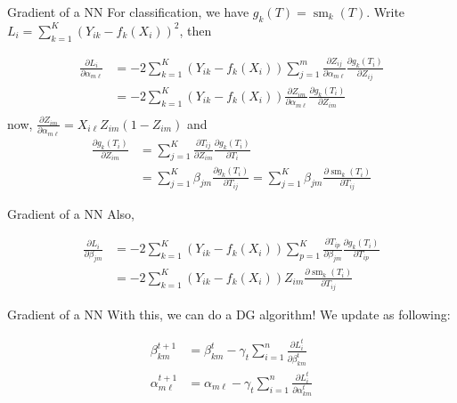 \documentclass[9pt,xcolor=table]{beamer}
\newcommand{\sm}{\operatorname{sm}}
\begin{document}
\begin{frame}{Gradient of a NN}
For classification, we have $g_k(T) = \sm_k(T)$. Write $L_i = \sum_{k=1}^K (Y_{ik} - f_{k}(X_i))^2$, then

\begin{align*}
\frac{\partial L_i}{\partial \alpha_{m \ell}} &= -2\sum_{k=1}^K(Y_{ik}-f_k(X_i))  \sum_{j=1}^m \frac{\partial Z_{ij}}{\partial \alpha_{ m \ell}} \frac{\partial g_k(T_i)}{\partial Z_{ij}}\\
&= -2\sum_{k=1}^K(Y_{ik}-f_k(X_i))  \frac{\partial Z_{im}}{\partial \alpha_{ m \ell}} \frac{\partial g_k(T_i)}{\partial Z_{im}}\\
\end{align*}
now, $\frac{\partial Z_{im}}{\partial \alpha_{m \ell}} = X_{i\ell} Z_{im}(1-Z_{im})$ and 
\begin{align*}
\frac{\partial g_k(T_i)}{\partial Z_{im}} &= \sum_{j=1}^K \frac{\partial T_{ij}}{\partial Z_{im}} \frac{\partial g_k(T_i)}{\partial T_i}\\
&=\sum_{j=1}^K \beta_{jm} \frac{\partial g_k(T_i)}{\partial T_{ij}} = \sum_{j=1}^K \beta_{jm} \frac{\partial \sm_k(T_i)}{\partial T_{ij}} 
\end{align*}

\end{frame}

\begin{frame}{Gradient of a NN}
Also, 

\begin{align*}
\frac{\partial L_i}{\partial \beta_{jm}} &= -2\sum_{k=1}^K (Y_{ik} - f_k(X_i)) \sum_{p=1}^K \frac{\partial T_{ip}}{\partial \beta_{jm}} \frac{\partial g_k(T_i)}{\partial T_{ip}}\\
&= -2\sum_{k=1}^K (Y_{ik} - f_k(X_i)) Z_{im} \frac{\partial \sm_k(T_i)}{\partial T_{ij}}
\end{align*}
\end{frame}

\begin{frame}{Gradient of a NN}
With this, we can do a DG algorithm!
We update as following:

\begin{align*}
\beta_{km}^{t+1} &= \beta_{km}^t- \gamma_t \sum_{i=1}^n \frac{\partial L_i^t}{\partial \beta_{km}^t}\\
\alpha_{m\ell}^{t+1} &= \alpha_{m\ell} - \gamma_t \sum_{i=1}^n \frac{\partial L_i^t}{\partial \alpha_{km}^t}
\end{align*}


\end{frame}
\end{document}
